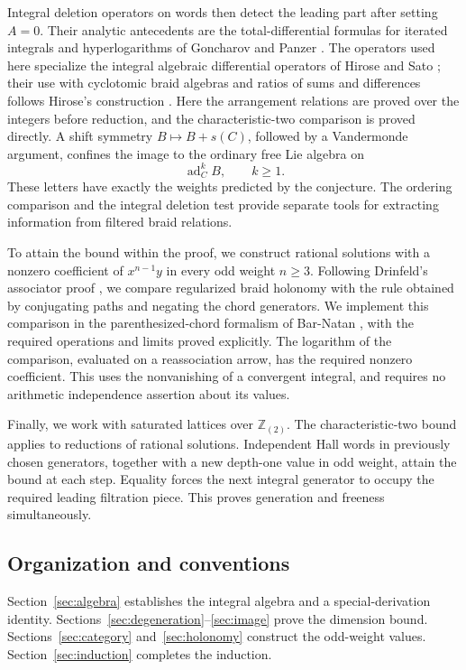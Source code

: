 \documentclass[11pt]{article}
\newcommand{\Z}{\mathbb Z}
\DeclareMathOperator{\ad}{ad}
\theoremstyle{definition}
\theoremstyle{remark}
\numberwithin{equation}{section}
\begin{document}
Integral deletion operators on words then detect the leading part
after setting \(A=0\).  Their analytic antecedents are the
total-differential formulas for iterated integrals and hyperlogarithms
of Goncharov \cite[Theorem~2.1]{Goncharov} and
Panzer \cite[Lemma~3.3.30]{Panzer}.
The operators used here specialize the integral
algebraic differential operators of Hirose and Sato
\cite[Section~2]{HiroseSato}; their use with cyclotomic braid algebras
and ratios of sums and differences follows Hirose's construction
\cite[Sections~4.3 and~6]{Hirose}.  Here the arrangement relations are proved over the
integers before reduction, and the characteristic-two comparison is
proved directly.  A shift symmetry
\(B\mapsto B+s(C)\), followed by a Vandermonde argument, confines the
image to the ordinary free Lie algebra on
\[
 \ad_C^kB,\qquad k\ge1.
\]
These letters have exactly the weights predicted by the conjecture.
The ordering comparison and the integral deletion test provide
separate tools for extracting information from filtered braid
relations.

To attain the bound within the proof, we construct rational solutions with a nonzero
coefficient of \(x^{n-1}y\) in every odd weight \(n\ge3\).
Following Drinfeld's associator proof
\cite[Proposition~6.3]{Drinfeld}, we compare regularized braid holonomy
with the rule obtained by conjugating paths and negating the chord
generators.  We implement
this comparison in the parenthesized-chord formalism of Bar-Natan
\cite[Sections~2--3]{BarNatan}, with the required operations and
limits proved explicitly.  The logarithm of the comparison,
evaluated on a reassociation arrow, has the required nonzero
coefficient.  This uses the nonvanishing of a convergent integral,
and requires no arithmetic independence assertion about its values.

Finally, we work with saturated lattices over \(\Z_{(2)}\).
The characteristic-two bound applies to reductions of rational
solutions.  Independent Hall words in previously chosen generators,
together with a new depth-one value in odd weight, attain the bound
at each step.
Equality forces the next integral generator to occupy the required
leading filtration piece.  This proves generation and freeness
simultaneously.

\subsection{Organization and conventions}
Section~\ref{sec:algebra} establishes the integral algebra and a
special-derivation identity.  Sections~\ref{sec:degeneration}--\ref{sec:image}
prove the dimension bound.  Sections~\ref{sec:category}
and~\ref{sec:holonomy} construct the odd-weight values.
Section~\ref{sec:induction} completes the induction.
\end{document}
